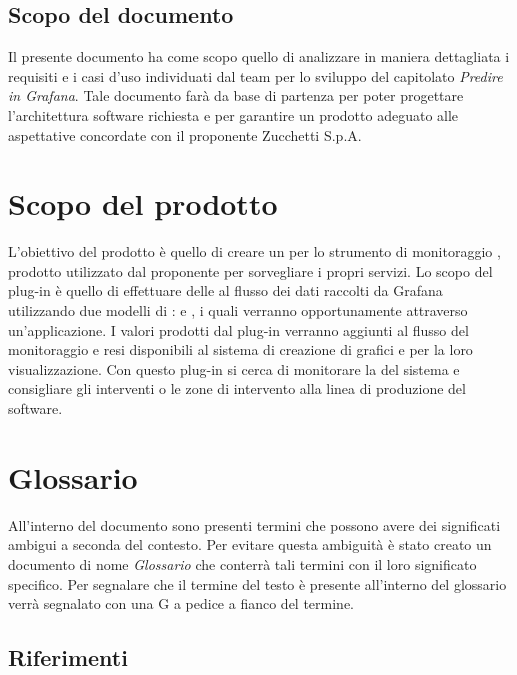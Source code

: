 \documentclass[../analisi-dei-requisiti.tex]{subfiles}
\begin{document}
\subsection{Scopo del documento}%
\label{sub:scopo_del_documento}
Il presente documento ha come scopo quello di analizzare in maniera dettagliata i requisiti e i casi d'uso individuati dal team per lo sviluppo del capitolato \emph{Predire in Grafana}. Tale documento farà da base di partenza per poter progettare l'architettura software richiesta e per garantire un prodotto adeguato alle aspettative concordate con il proponente Zucchetti S.p.A.

\section{Scopo del prodotto}%
\label{sub:scopo_del_prodotto}
L'obiettivo del prodotto è quello di creare un  per lo strumento di monitoraggio , prodotto utilizzato dal proponente per sorvegliare i propri servizi. Lo scopo del plug-in è quello di effettuare delle  al flusso dei dati raccolti da Grafana utilizzando due modelli di :  e , i quali verranno opportunamente  attraverso un'applicazione. I valori prodotti dal plug-in verranno aggiunti al flusso del monitoraggio e resi disponibili al sistema di creazione di grafici e  per la loro visualizzazione. Con questo plug-in si cerca di monitorare la  del sistema e consigliare gli interventi o le zone di intervento alla linea di produzione del software.

\section{Glossario}
\label{sub:glossario}
All'interno del documento sono presenti termini che possono avere dei significati ambigui a seconda del contesto. Per evitare questa ambiguità è stato creato un documento di nome  \textit{Glossario} che conterrà tali termini con il loro significato specifico. Per segnalare che il termine del testo è presente all'interno del glossario verrà segnalato con una G a pedice a fianco del termine.

\subsection{Riferimenti}%
\label{sub:riferimenti}
\end{document}
